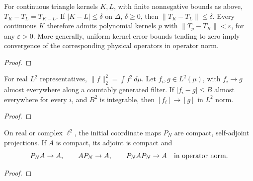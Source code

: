 \begin{supporting}
\begin{theorem}
\label{thm:volterra-kernel-norm}
\leanok
For continuous triangle kernels $K,L$, with finite nonnegative bounds as above,
$T_K-T_L=T_{K-L}$. If $|K-L|\le\delta$ on $\Delta$, $\delta\ge0$, then
$\|T_K-T_L\|\le\delta$. Every continuous $K$ therefore admits polynomial
kernels $p$ with $\|T_p-T_K\|<\varepsilon$, for any $\varepsilon>0$.
More generally, uniform kernel error bounds tending to zero imply convergence
of the corresponding physical operators in operator norm.
\end{theorem}
\begin{proof}
\leanok
\end{proof}

\begin{theorem}
\label{thm:l2-dominated-convergence}
\leanok
For real $L^2$ representatives, $\|f\|_2^2=\int f^2\,d\mu$.
Let $f_i,g\in L^2(\mu)$, with $f_i\to g$ almost everywhere along a countably
generated filter. If $|f_i-g|\le B$ almost everywhere for every $i$, and
$B^2$ is integrable, then $[f_i]\to[g]$ in $L^2$ norm.
\end{theorem}
\begin{proof}
\leanok
\end{proof}

\begin{theorem}
\label{thm:compact-l2-sections}
\leanok
On real or complex $\ell^2$, the initial coordinate maps $P_N$ are compact,
self-adjoint projections. If $A$ is compact, its adjoint is compact and
\[
 P_NA\to A,\qquad AP_N\to A,\qquad P_NAP_N\to A
 \quad\hbox{in operator norm}.
\]
\end{theorem}
\begin{proof}
\leanok
\end{proof}


\end{supporting}
